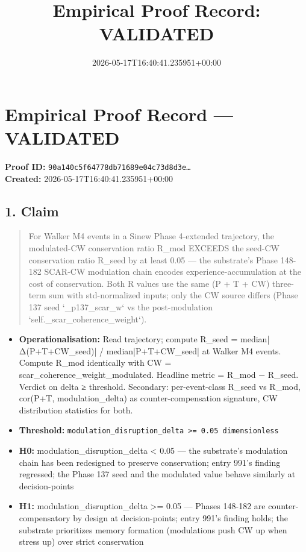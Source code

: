\documentclass{article}
\title{Empirical Proof Record: VALIDATED}
\date{2026-05-17T16:40:41.235951+00:00}
\begin{document}
\maketitle
\section*{Empirical Proof Record --- \textcolor{validated}{\textbf{VALIDATED}}}
\textbf{Proof ID:} \texttt{90a140c5f64778db71689e04c73d8d3e\dots}\\
\textbf{Created:} 2026-05-17T16:40:41.235951+00:00
\subsection*{1. Claim}
\begin{quote}For Walker M4 events in a Sinew Phase 4-extended trajectory, the modulated-CW conservation ratio R\_mod EXCEEDS the seed-CW conservation ratio R\_seed by at least 0.05 — the substrate's Phase 148-182 SCAR-CW modulation chain encodes experience-accumulation at the cost of conservation. Both R values use the same (P + T + CW) three-term sum with std-normalized inputs; only the CW source differs (Phase 137 seed `\_p137\_scar\_w` vs the post-modulation `self.\_scar\_coherence\_weight`).\end{quote}
\begin{itemize}
\item \textbf{Operationalisation:} Read trajectory; compute R\_seed = median|Δ(P+T+CW\_seed)| / median|P+T+CW\_seed| at Walker M4 events. Compute R\_mod identically with CW = scar\_coherence\_weight\_modulated. Headline metric = R\_mod − R\_seed. Verdict on delta ≥ threshold. Secondary: per-event-class R\_seed vs R\_mod, cor(P+T, modulation\_delta) as counter-compensation signature, CW distribution statistics for both.
\item \textbf{Threshold:} \texttt{modulation\_disruption\_delta >= 0.05 dimensionless}
\item \textbf{H0:} modulation\_disruption\_delta < 0.05 — the substrate's modulation chain has been redesigned to preserve conservation; entry 991's finding regressed; the Phase 137 seed and the modulated value behave similarly at decision-points
\item \textbf{H1:} modulation\_disruption\_delta >= 0.05 — Phases 148-182 are counter-compensatory by design at decision-points; entry 991's finding holds; the substrate prioritizes memory formation (modulations push CW up when stress up) over strict conservation
\end{itemize}
\end{document}
